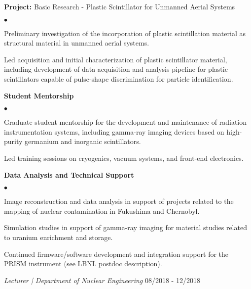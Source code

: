 \documentclass[margin,line]{res}
\newenvironment{list1}{
  \begin{list}{\ding{113}}{%
      \setlength{\itemsep}{0in}
      \setlength{\parsep}{0in} \setlength{\parskip}{0in}
      \setlength{\topsep}{0in} \setlength{\partopsep}{0in} 
      \setlength{\leftmargin}{0.17in}}}{\end{list}}
\newenvironment{list2}{
  \begin{list}{$\bullet$}{%
      \setlength{\itemsep}{0in}
      \setlength{\parsep}{0in} \setlength{\parskip}{0in}
      \setlength{\topsep}{0in} \setlength{\partopsep}{0in} 
      \setlength{\leftmargin}{0.2in}}}{\end{list}}
\begin{document}
\begin{resume}
\begin{list1}
  \item[] {\bf \small Project:} Basic Research - Plastic Scintillator for Unmanned Aerial Systems
  \begin{list2}
    \item Preliminary investigation of the incorporation of plastic 
          scintillation material as structural material in unmanned aerial
          systems.
    \item Led acquisition and initial characterization of plastic scintillator
          material, including development of data acquisition and analysis
          pipeline for plastic scintillators capable of pulse-shape
          discrimination for particle identification.
  \end{list2}
  \item[] {\bf \small Student Mentorship}
  \begin{list2}
    \item Graduate student mentorship for the development and maintenance of
          radiation instrumentation systems, including gamma-ray imaging
          devices based on high-purity germanium and inorganic scintillators.
    \item Led training sessions on cryogenics, vacuum systems, and front-end
          electronics.
  \end{list2}
  \item[] {\bf \small Data Analysis and Technical Support}
  \begin{list2}
    \item Image reconstruction and data analysis in support of projects 
          related to the mapping of nuclear contamination in Fukushima and
          Chernobyl.
    \item Simulation studies in support of gamma-ray imaging for
          material studies related to uranium enrichment and storage.
    \item Continued firmware/software development and integration support for
          the PRISM instrument (see LBNL postdoc description).
  \end{list2}
\end{list1}

{\em Lecturer | Department of Nuclear Engineering} \hfill 08/2018 - 12/2018


\end{resume}
\end{document}
